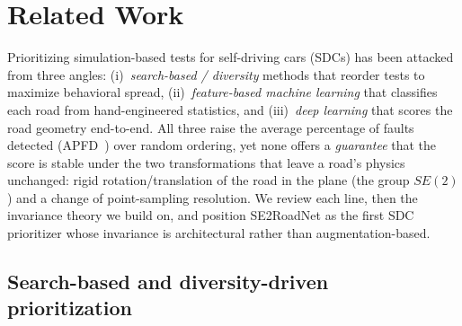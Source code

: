 
\section{Related Work}
\label{sec:related}

Prioritizing simulation-based tests for self-driving cars (SDCs) has been
attacked from three angles: (i)~\emph{search-based / diversity} methods that
reorder tests to maximize behavioral spread, (ii)~\emph{feature-based machine
learning} that classifies each road from hand-engineered statistics, and
(iii)~\emph{deep learning} that scores the road geometry end-to-end. All three
raise the average percentage of faults detected (APFD~\cite{apfd,yooharman})
over random ordering, yet none offers a \emph{guarantee} that the score is
stable under the two transformations that leave a road's physics unchanged:
rigid rotation/translation of the road in the plane (the group $SE(2)$) and a
change of point-sampling resolution. We review each line, then the invariance
theory we build on, and position SE2RoadNet as the first SDC prioritizer whose
invariance is architectural rather than augmentation-based.

\subsection{Search-based and diversity-driven prioritization}

